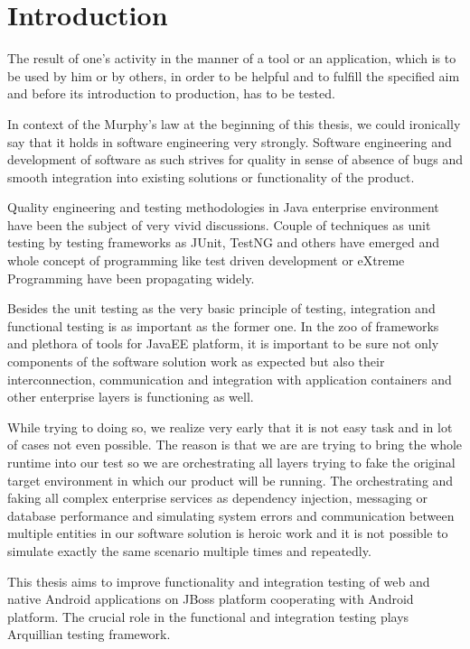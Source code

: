 \documentclass[12pt,final,oneside]{fithesis}
\begin{document}
\MainMatter
\tableofcontents

\chapter{Introduction}
The result of one's activity in the manner of a tool or an application, which is to be used by him or by others, in order to be helpful and to fulfill the specified aim and before its introduction to production, has to be tested.

In context of the Murphy's law at the beginning of this thesis, we could ironically say that it holds in software engineering very strongly. Software engineering and development of software as such strives for quality in sense of absence of bugs and smooth integration into existing solutions or functionality of the product.

Quality engineering and testing methodologies in Java enterprise environment have been the subject of very vivid discussions. Couple of techniques as unit testing by testing frameworks as JUnit, TestNG and others have emerged and whole concept of programming like test driven development or eXtreme Programming have been propagating widely. 

Besides the unit testing as the very basic principle of testing, integration and functional testing is as important as the former one. In the zoo of frameworks and plethora of tools for JavaEE platform, it is important to be sure not only components of the software solution work as expected but also their interconnection, communication and integration with application containers and other enterprise layers is functioning as well.

While trying to doing so, we realize very early that it is not easy task and in lot of cases not even possible. The reason is that we are are trying to bring the whole runtime into our test so we are orchestrating all layers trying to fake the original target environment in which our product will be running. The orchestrating and faking all complex enterprise services as dependency injection, messaging or database performance and simulating system errors and communication between multiple entities in our software solution is heroic work and it is not possible to simulate exactly the same scenario multiple times and repeatedly.

This thesis aims to improve functionality and integration testing of web and native Android applications on JBoss platform cooperating with Android platform. The crucial role in the functional and integration testing plays Arquillian testing framework.
\end{document}
